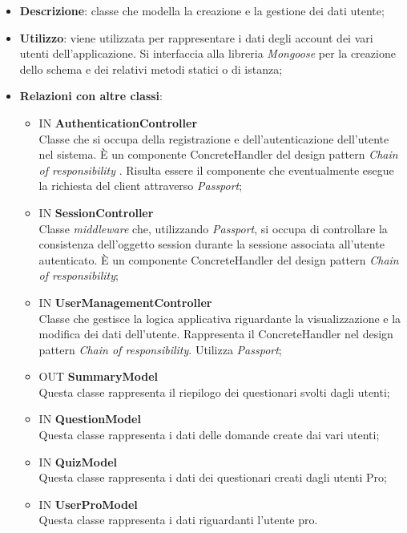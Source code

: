 \begin{itemize}
	\item \textbf{Descrizione}: classe che modella la creazione e la gestione dei dati utente;
	\item \textbf{Utilizzo}: viene utilizzata per rappresentare i dati degli account dei vari utenti dell'applicazione. Si interfaccia alla libreria \textit{Mongoose} per la creazione dello schema e dei relativi metodi statici o di istanza;
	\item \textbf{Relazioni con altre classi}:
		\begin{itemize}
			\item IN \textbf {AuthenticationController} \\
			Classe che si occupa della registrazione e dell'autenticazione dell'utente nel sistema. È un componente ConcreteHandler del design pattern \textit{Chain of responsibility} . Risulta essere il componente che eventualmente esegue la richiesta del client attraverso \textit{Passport};
			\item IN \textbf {SessionController} \\
			Classe \textit{middleware} che, utilizzando \textit{Passport}, si occupa di controllare la consistenza dell'oggetto session durante la sessione associata all’utente autenticato. È un componente ConcreteHandler del design pattern \textit{Chain of responsibility};
			\item IN \textbf {UserManagementController} \\
			Classe che gestisce la logica applicativa riguardante la visualizzazione e la modifica dei dati dell'utente.
Rappresenta il ConcreteHandler nel design pattern \textit{Chain of responsibility}. Utilizza \textit{Passport};
			\item OUT \textbf{SummaryModel} \\
			Questa classe rappresenta il riepilogo dei questionari svolti dagli utenti;
			\item IN \textbf{QuestionModel} \\
			Questa classe rappresenta i dati delle domande create dai vari utenti;
			\item IN \textbf{QuizModel} \\
			Questa classe rappresenta i dati dei questionari creati dagli utenti Pro;
			\item IN \textbf{UserProModel} \\
			Questa classe rappresenta i dati riguardanti l'utente pro.
		\end{itemize}

\end{itemize}
